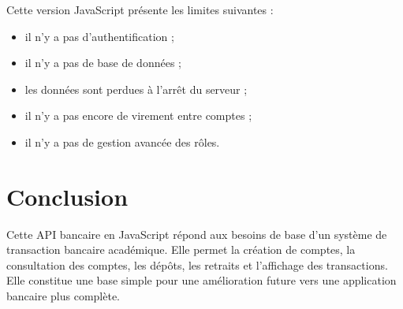 \documentclass[12pt,a4paper]{article}
\begin{document}
Cette version JavaScript présente les limites suivantes :

\begin{itemize}
    \item il n'y a pas d'authentification ;
    \item il n'y a pas de base de données ;
    \item les données sont perdues à l'arrêt du serveur ;
    \item il n'y a pas encore de virement entre comptes ;
    \item il n'y a pas de gestion avancée des rôles.
\end{itemize}

\section{Conclusion}

Cette API bancaire en JavaScript répond aux besoins de base d'un système de transaction bancaire académique. Elle permet la création de comptes, la consultation des comptes, les dépôts, les retraits et l'affichage des transactions. Elle constitue une base simple pour une amélioration future vers une application bancaire plus complète.
\end{document}
